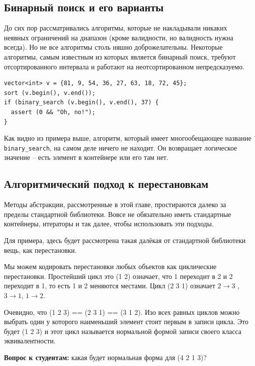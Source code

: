 \documentclass[a4paper,12pt,oneside]{book}
\newif\ifanswers
\begin{document}
\subsection{Бинарный поиск и его варианты}

До сих пор рассматривались алгоритмы, которые не накладывали никаких неявных ограничений на диапазон (кроме валидности, но валидность нужна всегда). Но не все алгоритмы столь няшно доброжелательны. Некоторые алгоритмы, самым известным из которых является бинарный поиск, требуют отсортированного интервала и работают на неотсортированном непредсказуемо.

\begin{lstlisting}
vector<int> v = {81, 9, 54, 36, 27, 63, 18, 72, 45};
sort (v.begin(), v.end());
if (binary_search (v.begin(), v.end(), 37) {
  assert (0 && "Oh, no!");
}
\end{lstlisting}

Как видно из примера выше, алгоритм, который имеет многообещающее название \lstinline!binary_search!, на самом деле ничего не находит. Он возвращает логическое значение -- есть элемент в контейнере или его там нет.

\subsection{Алгоритмический подход к перестановкам}\label{subsub:transpositions}

Методы абстракции, рассмотренные в этой главе, простираются далеко за пределы стандартной библиотеки. Вовсе не обязательно иметь стандартные контейнеры, итераторы и так далее, чтобы использовать эти подходы.

Для примера, здесь будет рассмотрена такая далёкая от стандартной библиотеки вещь, как перестановки.

Мы можем кодировать перестановки любых объектов как циклические перестановки. Простейший цикл это (1 2) означает, что 1 переходит в 2 и 2 переходит в 1, то есть 1 и 2 меняются местами. Цикл (2 3 1) означает $2 \rightarrow 3$ , $3 \rightarrow 1$, $1 \rightarrow 2$.

Очевидно, что (1 2 3) == (2 3 1) == (3 1 2). Изо всех равных циклов можно выбрать один у которого наименьший элемент стоит первым в записи цикла. Это будет (1 2 3) и этот цикл называется нормальной формой записи своего класса эквивалентности.

\textbf{Вопрос к студентам:} какая будет нормальная форма для (4 2 1 3)?

\ifanswers
Правильный ответ: разумеется (1 3 4 2)
\fi
\end{document}
